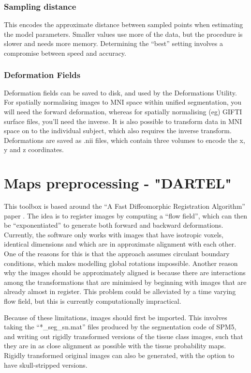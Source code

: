\subsubsection{Sampling distance}
This encodes the approximate distance between sampled points when estimating the model parameters. Smaller values use more of the data, but the procedure is slower and needs more memory. Determining the ``best'' setting involves a compromise between speed and accuracy.


\subsubsection{Deformation Fields}
Deformation fields can be saved to disk, and used by the Deformations Utility. For spatially normalising images to MNI space within unified segmentation, you will need the forward deformation, whereas for spatially normalising (eg) GIFTI surface files, you'll need the inverse. It is also possible to transform data in MNI space on to the individual subject, which also requires the inverse transform. Deformations are saved as .nii files, which contain three volumes to encode the x, y and z coordinates.


\section{Maps preprocessing - "DARTEL"}
This toolbox is based around the ``A Fast Diffeomorphic Registration Algorithm'' paper \cite{ashburner07} . The idea is to register images by computing a ``flow field'', which can then be ``exponentiated'' to generate both forward and backward deformations. Currently, the software only works with images that have isotropic voxels, identical dimensions and which are in approximate alignment with each other. One of the reasons for this is that the approach assumes circulant boundary conditions, which makes modelling global rotations impossible. Another reason why the images should be approximately aligned is because there are interactions among the transformations that are minimised by beginning with images that are already almost in register. This problem could be alleviated by a time varying flow field, but this is currently computationally impractical.

Because of these limitations, images should first be imported. This involves taking the ``*\_seg\_sn.mat'' files produced by the segmentation code of SPM5, and writing out rigidly transformed versions of the tissue class images, such that they are in as close alignment as possible with the tissue probability maps. Rigidly transformed original images can also be generated, with the option to have skull-stripped versions.

